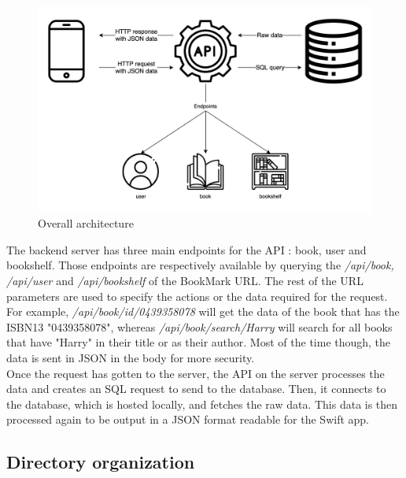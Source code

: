 \documentclass[conference]{IEEEtran}
\begin{document}
\begin{figure}[h]
    \includegraphics[width=\columnwidth]{Resources/Architecture/Overall.png} 
    \caption{Overall architecture}
    \label{fig:architecture}
\end{figure}

The backend server has three main endpoints for the API : book, user and bookshelf. Those endpoints are respectively available by querying the \textit{/api/book,} \textit{/api/user} and \textit{/api/bookshelf} of the BookMark URL. The rest of the URL parameters are used to specify the actions or the data required for the request. For example, \textit{/api/book/id/0439358078} will get the data of the book that has the ISBN13 "0439358078", whereas \textit{/api/book/search/Harry} will search for all books that have "Harry" in their title or as their author. Most of the time though, the data is sent in JSON in the body for more security.\\
Once the request has gotten to the server, the API on the server processes the data and creates an SQL request to send to the database. Then, it connects to the database, which is hosted locally, and fetches the raw data. This data is then processed again to be output in a JSON format readable for the Swift app.



\subsection{Directory organization}
\end{document}
